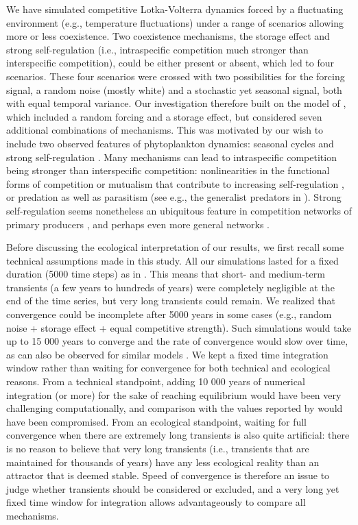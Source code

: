 \documentclass[a4paper,12pt]{article}
\begin{document}
We have simulated competitive Lotka-Volterra dynamics forced by a
fluctuating environment (e.g., temperature fluctuations) under a range
of scenarios allowing more or less coexistence. Two coexistence mechanisms,
the storage effect and strong self-regulation (i.e., intraspecific
competition much stronger than interspecific competition), could be
either present or absent, which led to four scenarios. These four
scenarios were crossed with two possibilities for the forcing signal,
a random noise (mostly white) and a stochastic yet seasonal signal,
both with equal temporal variance. Our investigation therefore built
on the model of \citet{scranton_coexistence_2016}, which included
a random forcing and a storage effect, but considered seven additional
combinations of mechanisms. This was motivated by our wish to include
two observed features of phytoplankton dynamics: seasonal cycles \citep{winder_annual_2010}
and strong self-regulation \citep{chesson_mechanisms_2000,adler_coexistence_2010,barraquand2018coastal}.
Many mechanisms can lead to intraspecific competition being stronger
than interspecific competition: nonlinearities in the functional forms
of competition or mutualism that contribute to increasing self-regulation
\citep{kawatsu2018density}, or predation as well as parasitism (see
e.g., the generalist predators in \citealp{haydon1994pivotal}). Strong
self-regulation seems nonetheless an ubiquitous feature in competition
networks of primary producers \citep{adler_competition_2018}, and
perhaps even more general networks \citep{barabas_self-regulation_2017}.

Before discussing the ecological interpretation of our results, we
first recall some technical assumptions made in this study. All our
simulations lasted for a fixed duration (5000 time steps) as in \citet{scranton_coexistence_2016}.
This means that short- and medium-term transients (a few years to
hundreds of years) were completely negligible at the end of the time
series, but very long transients could remain. We realized that convergence
could be incomplete after 5000 years in some cases (e.g., random noise
+ storage effect + equal competitive strength). Such simulations would
take up to 15 000 years to converge and the rate of convergence would
slow over time, as can also be observed for similar models \citep{scheffer_self-organized_2006}.
We kept a fixed time integration window rather than waiting for convergence
for both technical and ecological reasons. From a technical standpoint,
adding 10 000 years of numerical integration (or more) for the sake
of reaching equilibrium would have been very challenging computationally,
and comparison with the values reported by \citet{scranton_coexistence_2016}
would have been compromised. From an ecological standpoint, waiting
for full convergence when there are extremely long transients \citep{hastings_transient_2018}
is also quite artificial: there is no reason to believe that very
long transients (i.e., transients that are maintained for thousands of
years) have any less ecological reality than an attractor that is
deemed stable. Speed of convergence is therefore an issue to judge
whether transients should be considered or excluded, and a very long
yet fixed time window for integration allows advantageously to compare
all mechanisms. 
\end{document}
